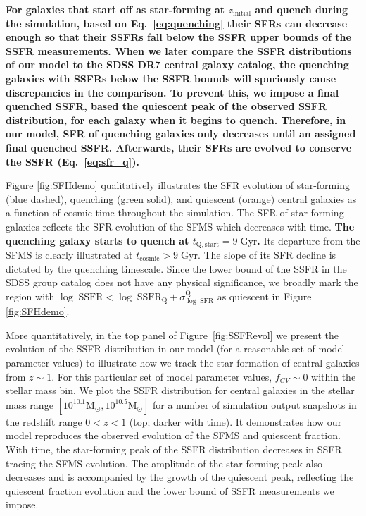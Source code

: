 \documentclass[iop,apj,tighten,twocolappendix,numberedappendix]{emulateapj}
\newcommand{\zinit}{z_\mathrm{initial}}
\begin{document}
{\bf \color{dred}
For galaxies that start off as star-forming at $\zinit$ and 
quench during the simulation, based on Eq.~\ref{eq:quenching} 
their SFRs can decrease enough so that their SSFRs fall below 
the SSFR upper bounds of the \cite{Brinchmann:2004aa} SSFR 
measurements. When we later compare the SSFR distributions of our model to 
the SDSS DR7 central galaxy catalog, the quenching galaxies with 
SSFRs below the SSFR bounds will spuriously cause discrepancies 
in the comparison. To prevent this, we impose a final quenched 
SSFR, based the quiescent peak of the observed SSFR distribution, 
for each galaxy when it begins to quench. Therefore, in our model, 
SFR of quenching galaxies only decreases until an assigned final 
quenched SSFR. Afterwards, their SFRs are evolved to conserve 
the SSFR (Eq.~\ref{eq:sfr_q}). 
}

Figure \ref{fig:SFHdemo} qualitatively illustrates the SFR evolution of 
star-forming (blue dashed), quenching (green solid), and quiescent (orange) 
central galaxies as a function of cosmic time throughout the simulation. 
The SFR of star-forming galaxies reflects the SFR evolution of the SFMS 
which decreases with time. 
{
\color{dred} \bf The quenching galaxy starts to quench
at $t_\mathrm{Q, start} = 9\;\mathrm{Gyr}$.
} 
Its departure from the SFMS 
is clearly illustrated at $t_\mathrm{cosmic} > 9\;\mathrm{Gyr}$. The slope
of its SFR decline is dictated by the quenching timescale. Since the 
lower bound of the SSFR in the SDSS group catalog does not have any 
physical significance, we broadly mark the region with 
$\log\;\mathrm{SSFR} < \log\;\mathrm{SSFR}_\mathrm{Q} + 
\sigma^\mathrm{Q}_{\log\;\mathrm{SFR}}$ as quiescent in Figure \ref{fig:SFHdemo}. 

More quantitatively, in the top panel of Figure~\ref{fig:SSFRevol} 
we present the evolution of the SSFR distribution in our model 
(for a reasonable set of model parameter values) to illustrate how 
we track the star formation of central galaxies from $z \sim 1$. 
For this particular set of model parameter values, $f_{GV} \sim 0$ 
within the stellar mass bin.
We plot the SSFR distribution for central galaxies in the stellar 
mass range $[10^{10.1}\mathrm{M}_\odot, 10^{10.5}\mathrm{M}_\odot]$ 
for a number of simulation output snapshots in the redshift range 
$0 < z < 1$ (top; darker with time). 
It demonstrates how our model reproduces the observed evolution 
of the SFMS and quiescent fraction.
With time, the star-forming peak of the SSFR distribution 
decreases in SSFR tracing the SFMS evolution. The amplitude of 
the star-forming peak also decreases and is accompanied by the 
growth of the quiescent peak, reflecting the quiescent 
fraction evolution and the lower bound of SSFR measurements we impose.
\end{document}
